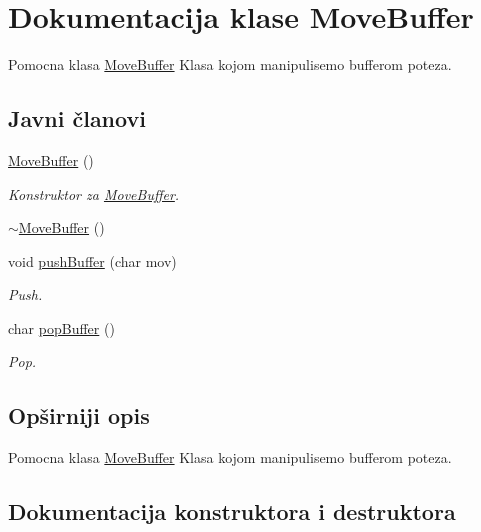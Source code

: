 \hypertarget{classMoveBuffer}{}\section{Dokumentacija klase Move\+Buffer}
\label{classMoveBuffer}


Pomocna klasa \hyperlink{classMoveBuffer}{Move\+Buffer} Klasa kojom manipulisemo bufferom poteza.  


\subsection*{Javni članovi}
\begin{DoxyCompactItemize}
\item 
\hyperlink{classMoveBuffer_ae52f3c5bb37eea074295e90136886aaf}{Move\+Buffer} ()
\begin{DoxyCompactList}\small\item\em Konstruktor za \hyperlink{classMoveBuffer}{Move\+Buffer}. \end{DoxyCompactList}\item 
\hyperlink{classMoveBuffer_a106f14ba670e22f19f3070a680632155}{$\sim$\+Move\+Buffer} ()
\item 
void \hyperlink{classMoveBuffer_a7dc9d060f9468fdf327516f502379809}{push\+Buffer} (char mov)
\begin{DoxyCompactList}\small\item\em Push. \end{DoxyCompactList}\item 
char \hyperlink{classMoveBuffer_ae2e4518535c042b8333f73f028a70201}{pop\+Buffer} ()
\begin{DoxyCompactList}\small\item\em Pop. \end{DoxyCompactList}\end{DoxyCompactItemize}


\subsection{Opširniji opis}
Pomocna klasa \hyperlink{classMoveBuffer}{Move\+Buffer} Klasa kojom manipulisemo bufferom poteza. 

\subsection{Dokumentacija konstruktora i destruktora}
